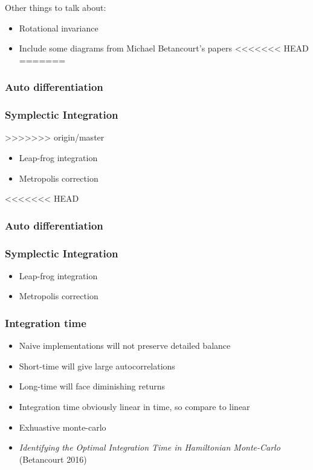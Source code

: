 \documentclass{article}
\begin{document}
Other things to talk about:
\begin{itemize}

\item Rotational invariance

\item Include some diagrams from Michael Betancourt's papers
<<<<<<< HEAD
=======

\end{itemize}

\subsubsection{Auto differentiation}

\subsubsection{Symplectic Integration}
>>>>>>> origin/master

\begin{itemize}
\item Leap-frog integration
\item Metropolis correction
\end{itemize}

<<<<<<< HEAD
\subsubsection{Auto differentiation}

\subsubsection{Symplectic Integration}

\begin{itemize}
\item Leap-frog integration
\item Metropolis correction
\end{itemize}

\subsubsection{Integration time}

\begin{itemize}
\item Naive implementations will not preserve detailed balance
\item Short-time will give large autocorrelations
\item Long-time will face diminishing returns
\item Integration time obviously linear in time, so compare to linear
\item Exhuastive monte-carlo
\item \emph{Identifying the Optimal Integration Time in Hamiltonian Monte-Carlo} (Betancourt 2016)
\end{itemize}
\end{document}

